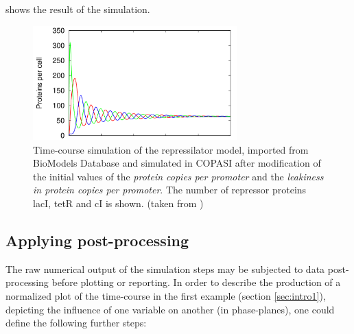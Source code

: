  shows the result of the simulation.
%
\begin{figure}
\centering
\includegraphics[width=0.7\textwidth]{images/simEx3.png}
\caption{Time-course simulation of the repressilator model, imported from BioModels Database and simulated in COPASI after modification of the initial values of the \emph{protein copies per promoter} and the \emph{leakiness in protein copies per promoter}. The number of repressor proteins lacI, tetR and cI is shown. (taken from \cite{Waltemath:2011})}
\label{fig:simEx3}
\end{figure}

\subsection{Applying post-processing}
The raw numerical output of the simulation steps may be subjected to data post-processing before plotting or reporting.  In order to describe the production of a normalized plot of the time-course in the first example (section \ref{sec:intro1}), depicting the influence of one variable on another (in phase-planes), one could define the following further steps:

